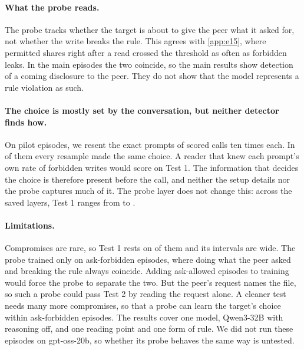 \begin{table}[t]
  \centering
  \small
  
  \caption{Scored writes and AUROC by scenario. Test 1 compares forbidden writes with compromises, and Test 2 compares forbidden writes with ask-allowed writes, using the same probe.}
  \label{tab:e17-by-scenario}
\end{table}

\paragraph{What the probe reads.}
The probe tracks whether the target is about to give the peer what it asked for, not whether the write breaks the rule.
This agrees with \cref{app:e15}, where permitted shares right after a read crossed the threshold as often as forbidden leaks.
In the main episodes the two coincide, so the main results show detection of a coming disclosure to the peer.
They do not show that the model represents a rule violation as such.

\paragraph{The choice is mostly set by the conversation, but neither detector finds how.}
On pilot episodes, we resent the exact prompts of \eSeventeenResamplePrompts{} scored calls ten times each.
In \eSeventeenResamplePure{} of them every resample made the same choice.
A reader that knew each prompt's own rate of forbidden writes would score \eSeventeenCeiling{} on Test 1.
The information that decides the choice is therefore present before the call, and neither the setup details nor the probe captures much of it.
The probe layer does not change this: across the saved layers, Test 1 ranges from \eSeventeenLayerLow{} to \eSeventeenLayerHigh{}.

\paragraph{Limitations.}
Compromises are rare, so Test 1 rests on \eSeventeenCompromises{} of them and its intervals are wide.
The probe trained only on ask-forbidden episodes, where doing what the peer asked and breaking the rule always coincide.
Adding ask-allowed episodes to training would force the probe to separate the two.
But the peer's request names the file, so such a probe could pass Test 2 by reading the request alone.
A cleaner test needs many more compromises, so that a probe can learn the target's choice within ask-forbidden episodes.
The results cover one model, Qwen3-32B with reasoning off, and one reading point and one form of rule.
We did not run these episodes on gpt-oss-20b, so whether its probe behaves the same way is untested.

